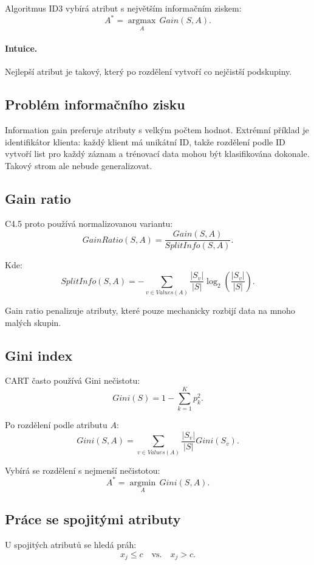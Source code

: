 Algoritmus ID3 vybírá atribut s největším informačním ziskem:
\[
A^*
=
\underset{A}{\operatorname{argmax}}
\,
Gain(S,A).
\]

\paragraph{Intuice.}
Nejlepší atribut je takový, který po rozdělení vytvoří co nejčistší podskupiny.

\subsection{Problém informačního zisku}

Information gain preferuje atributy s velkým počtem hodnot. Extrémní příklad je identifikátor klienta:
každý klient má unikátní ID, takže rozdělení podle ID vytvoří list pro každý záznam a trénovací data mohou být
klasifikována dokonale. Takový strom ale nebude generalizovat.

\subsection{Gain ratio}

C4.5 proto používá normalizovanou variantu:
\[
GainRatio(S,A)
=
\frac{Gain(S,A)}
{SplitInfo(S,A)}.
\]

Kde:
\[
SplitInfo(S,A)
=
-\sum_{v\in Values(A)}
\frac{|S_v|}{|S|}
\log_2
\left(
\frac{|S_v|}{|S|}
\right).
\]

Gain ratio penalizuje atributy, které pouze mechanicky rozbijí data na mnoho malých skupin.

\subsection{Gini index}

CART často používá Gini nečistotu:
\[
Gini(S)
=
1-\sum_{k=1}^K p_k^2.
\]

Po rozdělení podle atributu $A$:
\[
Gini(S,A)
=
\sum_{v\in Values(A)}
\frac{|S_v|}{|S|}
Gini(S_v).
\]

Vybírá se rozdělení s nejmenší nečistotou:
\[
A^*
=
\underset{A}{\operatorname{argmin}}
\,
Gini(S,A).
\]

\subsection{Práce se spojitými atributy}

U spojitých atributů se hledá práh:
\[
x_j \leq c
\quad
\text{vs.}
\quad
x_j > c.
\]

